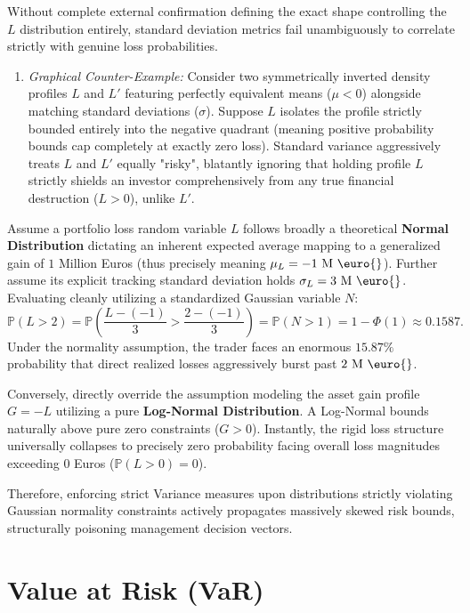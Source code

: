 Without complete external confirmation defining the exact shape controlling the $L$ distribution entirely, standard deviation metrics fail unambiguously to correlate strictly with genuine loss probabilities.
\begin{enumerate}
    \item \textit{Graphical Counter-Example:} Consider two symmetrically inverted density profiles $L$ and $L'$ featuring perfectly equivalent means ($\mu < 0$) alongside matching standard deviations ($\sigma$). Suppose $L$ isolates the profile strictly bounded entirely into the negative quadrant (meaning positive probability bounds cap completely at exactly zero loss). Standard variance aggressively treats $L$ and $L'$ equally "risky", blatantly ignoring that holding profile $L$ strictly shields an investor comprehensively from any true financial destruction ($L > 0$), unlike $L'$.
\end{enumerate}

\begin{example}
Assume a portfolio loss random variable $L$ follows broadly a theoretical \textbf{Normal Distribution} dictating an inherent expected average mapping to a generalized gain of $1$ Million Euros (thus precisely meaning $\mu_L = -1 \text{ M \euro{}}$). Further assume its explicit tracking standard deviation holds $\sigma_L = 3 \text{ M \euro{}}$. Evaluating cleanly utilizing a standardized Gaussian variable $N$:
$$
\mathbb{P}(L > 2) = \mathbb{P}\left(\frac{L - (-1)}{3} > \frac{2 - (-1)}{3}\right) = \mathbb{P}(N > 1) = 1 - \Phi(1) \approx 0.1587.
$$
Under the normality assumption, the trader faces an enormous $15.87\%$ probability that direct realized losses aggressively burst past $2 \text{ M \euro{}}$. 

Conversely, directly override the assumption modeling the asset gain profile $G = -L$ utilizing a pure \textbf{Log-Normal Distribution}. A Log-Normal bounds naturally above pure zero constraints ($G > 0$). Instantly, the rigid loss structure universally collapses to precisely zero probability facing overall loss magnitudes exceeding $0$ Euros ($\mathbb{P}(L > 0) = 0$).

Therefore, enforcing strict Variance measures upon distributions strictly violating Gaussian normality constraints actively propagates massively skewed risk bounds, structurally poisoning management decision vectors.
\end{example}

\section{Value at Risk (VaR)}

